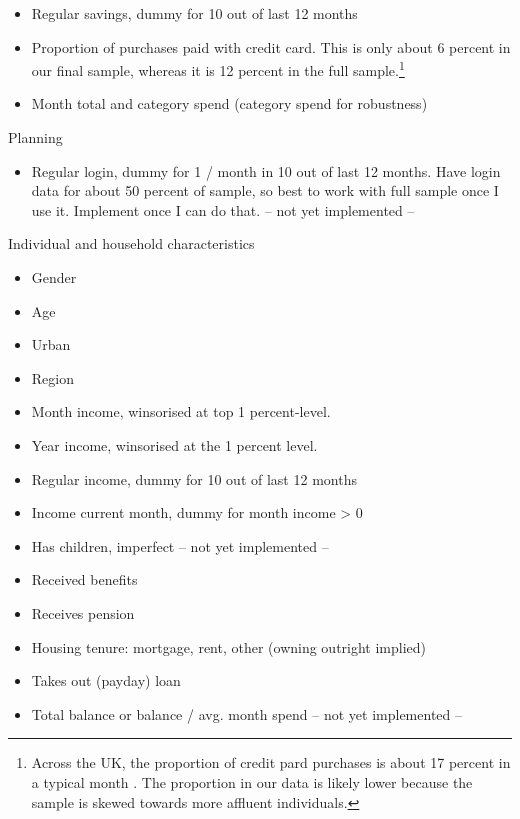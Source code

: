 \begin{itemize}
    \item Regular savings, dummy for 10 out of last 12 months

    \item Proportion of purchases paid with credit card. This is only about 6
        percent in our final sample, whereas it is 12 percent in the full
        sample.\footnote{Across the UK, the proportion of credit pard purchases
            is about 17 percent in a typical month \citep{ukfinance2021card}.
            The proportion in our data is likely lower because the sample is
        skewed towards more affluent individuals.}

    \item Month total and category spend (category spend for robustness)
\end{itemize}

Planning
\begin{itemize}
    \item Regular login, dummy for 1 / month in 10 out of last 12 months. Have
        login data for about 50 percent of sample, so best to work with full
        sample once I use it. Implement once I can do that. -- not yet
        implemented --
\end{itemize}

Individual and household characteristics
\begin{itemize}
    \item Gender

    \item Age

    \item Urban

    \item Region

    \item Month income, winsorised at top 1 percent-level.

    \item Year income, winsorised at the 1 percent level.

    \item Regular income, dummy for 10 out of last 12 months

    \item Income current month, dummy for month income > 0

    \item Has children, imperfect -- not yet implemented --

    \item Received benefits

    \item Receives pension

    \item Housing tenure: mortgage, rent, other (owning outright implied)

    \item Takes out (payday) loan

    \item Total balance or balance / avg. month spend -- not yet implemented --
\end{itemize}







